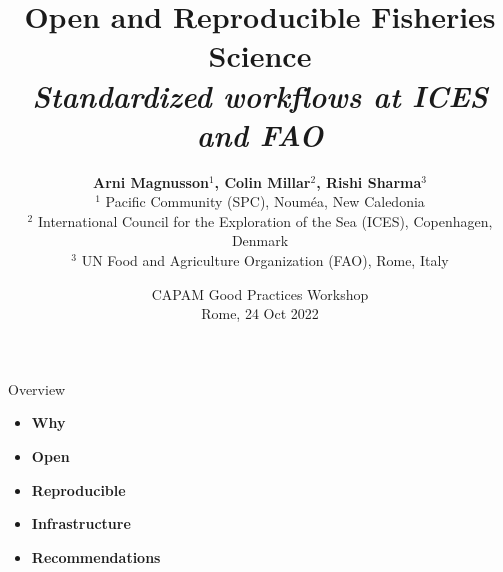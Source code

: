 \documentclass[aspectratio=169]{beamer}
\begin{document}
\begin{frame}
  \title{\vspace{-4ex}
    Open and Reproducible Fisheries Science\\[0.5ex]
    \Large\it Standardized workflows at ICES and FAO}
  \author{\vspace{-16ex}\small\darkgreen
    {\bf Arni Magnusson$^1$, Colin Millar$^2$, Rishi Sharma$^3$}\\[1ex]
    \scriptsize\darkgray
    $^1$ Pacific Community (SPC), Nouméa, New Caledonia\\
    $^2$ International Council for the Exploration of the Sea (ICES),
    Copenhagen, Denmark\\
    $^3$ UN Food and Agriculture Organization (FAO), Rome, Italy}
  \date{
    CAPAM Good Practices Workshop\\[0.5ex]
    Rome, 24 Oct 2022}
  \titlepage
\end{frame}


\begin{frame}{Overview}
  \begin{itemize}
    \item[] {\bf\darkblue Why} \\[3ex]
    \item[] {\bf\darkblue Open} \\[3ex]
    \item[] {\bf\darkblue Reproducible} \\[3ex]
    \item[] {\bf\darkblue Infrastructure}
    \\[3ex]
    \item[] {\bf\darkblue Recommendations}
    \\[3ex]
  \end{itemize}
\end{frame}
\end{document}
